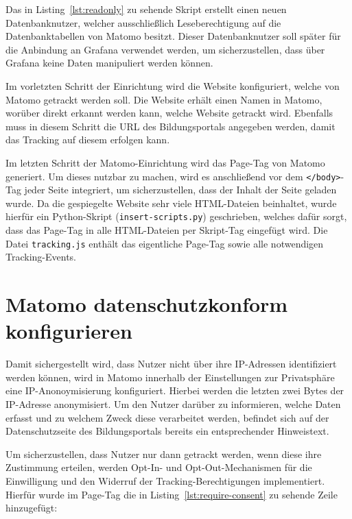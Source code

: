 Das in Listing~\ref{lst:readonly} zu sehende Skript erstellt einen neuen Datenbanknutzer, welcher ausschließlich Leseberechtigung auf die Datenbanktabellen von Matomo besitzt. Dieser Datenbanknutzer soll später für die Anbindung an Grafana verwendet werden, um sicherzustellen, dass über Grafana keine Daten manipuliert werden können. 

Im vorletzten Schritt der Einrichtung wird die Website konfiguriert, welche von Matomo getrackt werden soll. Die Website erhält einen Namen in Matomo, worüber direkt erkannt werden kann, welche Website getrackt wird. Ebenfalls muss in diesem Schritt die URL des Bildungsportals angegeben werden, damit das Tracking auf diesem erfolgen kann.  

Im letzten Schritt der Matomo-Einrichtung wird das Page-Tag von Matomo generiert. Um dieses nutzbar zu machen, wird es anschließend vor dem \texttt{</body>}-Tag jeder Seite integriert, um sicherzustellen, dass der Inhalt der Seite geladen wurde. Da die gespiegelte Website sehr viele HTML-Dateien beinhaltet, wurde hierfür ein Python-Skript (\texttt{insert\allowbreak-scripts.py}) geschrieben, welches dafür sorgt, dass das Page-Tag in alle HTML-Dateien per Skript-Tag eingefügt wird. Die Datei \texttt{tracking.js} enthält das eigentliche Page-Tag sowie alle notwendigen Tracking-Events.


\section{Matomo datenschutzkonform konfigurieren}
Damit sichergestellt wird, dass Nutzer nicht über ihre IP-Adressen identifiziert werden können, wird in Matomo innerhalb der Einstellungen zur Privatsphäre eine IP-Anonoymisierung konfiguriert. Hierbei werden die letzten zwei Bytes der IP-Adresse anonymisiert. Um den Nutzer darüber zu informieren, welche Daten erfasst und zu welchem Zweck diese verarbeitet werden, befindet sich auf der Datenschutzseite des Bildungsportals bereits ein entsprechender Hinweistext.

Um sicherzustellen, dass Nutzer nur dann getrackt werden, wenn diese ihre Zustimmung erteilen, werden Opt-In- und Opt-Out-Mechanismen für die Einwilligung und den Widerruf der Tracking-Berechtigungen implementiert. Hierfür wurde im Page-Tag die in Listing~\ref{lst:require-consent} zu sehende Zeile hinzugefügt: 

\begin{figure}[H]
    \centering
    \begin{minipage}{\textwidth}
        
    \end{minipage}
\end{figure}

